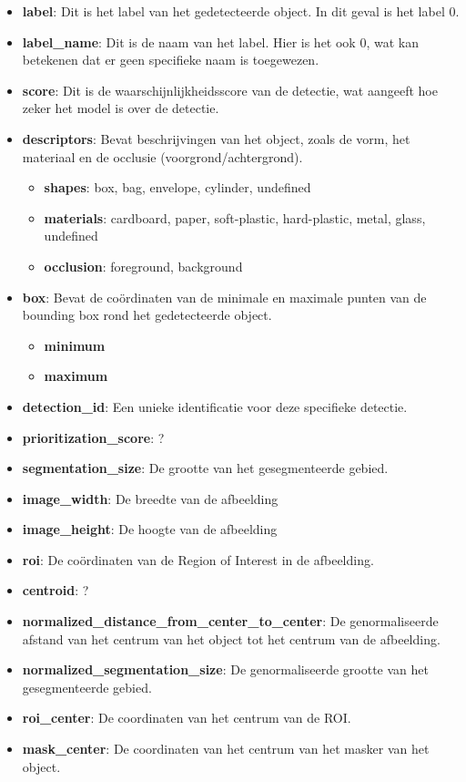 \documentclass[11pt]{article}
\providecommand{\tightlist}{%
      \setlength{\itemsep}{0pt}\setlength{\parskip}{0pt}}
\begin{document}
\begin{itemize}
\item
  \textbf{label}: Dit is het label van het gedetecteerde object. In dit
  geval is het label 0.
\item
  \textbf{label\_name}: Dit is de naam van het label. Hier is het ook 0,
  wat kan betekenen dat er geen specifieke naam is toegewezen.
\item
  \textbf{score}: Dit is de waarschijnlijkheidsscore van de detectie,
  wat aangeeft hoe zeker het model is over de detectie.
\item
  \textbf{descriptors}: Bevat beschrijvingen van het object, zoals de
  vorm, het materiaal en de occlusie (voorgrond/achtergrond).

  \begin{itemize}
  \tightlist
  \item
    \textbf{shapes}: box, bag, envelope, cylinder, undefined
  \item
    \textbf{materials}: cardboard, paper, soft-plastic, hard-plastic,
    metal, glass, undefined
  \item
    \textbf{occlusion}: foreground, background
  \end{itemize}
\item
  \textbf{box}: Bevat de coördinaten van de minimale en maximale punten
  van de bounding box rond het gedetecteerde object.

  \begin{itemize}
  \tightlist
  \item
    \textbf{minimum}
  \item
    \textbf{maximum}
  \end{itemize}
\item
  \textbf{detection\_id}: Een unieke identificatie voor deze specifieke
  detectie.
\item
  \textbf{prioritization\_score}: ?
\item
  \textbf{segmentation\_size}: De grootte van het gesegmenteerde gebied.
\item
  \textbf{image\_width}: De breedte van de afbeelding
\item
  \textbf{image\_height}: De hoogte van de afbeelding
\item
  \textbf{roi}: De coördinaten van de Region of Interest in de
  afbeelding.
\item
  \textbf{centroid}: ?
\item
  \textbf{normalized\_distance\_from\_center\_to\_center}: De
  genormaliseerde afstand van het centrum van het object tot het centrum
  van de afbeelding.
\item
  \textbf{normalized\_segmentation\_size}: De genormaliseerde grootte
  van het gesegmenteerde gebied.
\item
  \textbf{roi\_center}: De coordinaten van het centrum van de ROI.
\item
  \textbf{mask\_center}: De coordinaten van het centrum van het masker
  van het object.
\end{itemize}
\end{document}
